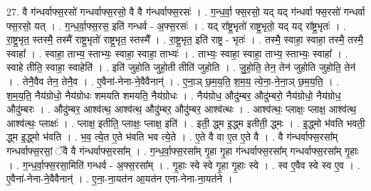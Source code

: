 \documentclass[17pt]{extarticle}
\begin{document}
27. वै ग॑न्धर्वाफ्स॒रसो॑ गन्धर्वाफ्स॒रसो॒ वै वै ग॑न्धर्वाफ्स॒रसः॑ । . ग॒न्ध॒र्वा॒ फ्स॒रसो॒ यद् यद् ग॑न्धर्वा फ्स॒रसो॑ गन्धर्वा फ्स॒रसो॒ यत् । . ग॒न्ध॒र्वा॒फ्स॒रस॒ इति॑ गन्धर्व - अ॒फ्स॒रसः॑ । . यद् रा᳚ष्ट्र॒भृतो॑ राष्ट्र॒भृतो॒ यद् यद् रा᳚ष्ट्र॒भृतः॑ । . रा॒ष्ट्र॒भृत॒ स्तस्मै॒ तस्मै॑ राष्ट्र॒भृतो॑ राष्ट्र॒भृत॒ स्तस्मै᳚ । . रा॒ष्ट्र॒भृत॒ इति॑ राष्ट्र - भृतः॑ । . तस्मै॒ स्वाहा॒ स्वाहा॒ तस्मै॒ तस्मै॒ स्वाहा᳚ । . स्वाहा॒ ताभ्य॒ स्ताभ्यः॒ स्वाहा॒ स्वाहा॒ ताभ्यः॑ । . ताभ्यः॒ स्वाहा॒ स्वाहा॒ ताभ्य॒ स्ताभ्यः॒ स्वाहा᳚ । . स्वाहे तीति॒ स्वाहा॒ स्वाहेति॑ । . इति॑ जुहोति जुहो॒ती तीति॑ जुहोति । . जु॒हो॒ति॒ तेन॒ तेन॑ जुहोति जुहोति॒ तेन॑ । . तेनै॒वैव तेन॒ तेनै॒व । . ए॒वैना॑-नेना-ने॒वैवैनान्॑ । . ए॒ना॒ञ् छ॒म॒य॒ति॒ श॒म॒य॒ त्ये॒ना॒-ने॒ना॒ञ् छ॒म॒य॒ति॒ । . श॒म॒य॒ति॒ नैय॑ग्रोधो॒ नैय॑ग्रोधः शमयति शमयति॒ नैय॑ग्रोधः । . नैय॑ग्रोध॒ औदु॑म्बर॒ औदु॑म्बरो॒ नैय॑ग्रोधो॒ नैय॑ग्रोध॒ औदु॑म्बरः । . औदु॑म्बर॒ आश्व॑त्थ॒ आश्व॑त्थ॒ औदु॑म्बर॒ औदु॑म्बर॒ आश्व॑त्थः । . आश्व॑त्थः॒ प्लाक्षः॒ प्लाक्ष॒ आश्व॑त्थ॒ आश्व॑त्थः॒ प्लाक्षः॑ । . प्लाक्ष॒ इतीति॒ प्लाक्षः॒ प्लाक्ष॒ इति॑ । . इती॒ द्ध्म इ॒द्ध्म इतीती॒ द्ध्मः । . इ॒द्ध्मो भ॑वति भवती॒ द्ध्म इ॒द्ध्मो भ॑वति । . भ॒व॒ त्ये॒त ए॒ते भ॑वति भव त्ये॒ते । . ए॒ते वै वा ए॒त ए॒ते वै । . वै ग॑न्धर्वाफ्स॒रसा᳚म् गन्धर्वाफ्स॒रसां॒ ॅवै वै ग॑न्धर्वाफ्स॒रसा᳚म् । . ग॒न्ध॒र्वा॒फ्स॒रसा᳚म् गृ॒हा गृ॒हा ग॑न्धर्वाफ्स॒रसा᳚म् गन्धर्वाफ्स॒रसा᳚म् गृ॒हाः । . ग॒न्ध॒र्वा॒फ्स॒रसा॒मिति॑ गन्धर्व - अ॒फ्स॒रसा᳚म् । . गृ॒हाः स्वे स्वे गृ॒हा गृ॒हाः स्वे । . स्व ए॒वैव स्वे स्व ए॒व । . ए॒वैना॑-नेना-ने॒वैवैनान्॑ । . ए॒ना॒-ना॒यत॑न आ॒यत॑न एना-नेना-ना॒यत॑ने । \newline
\end{document}
